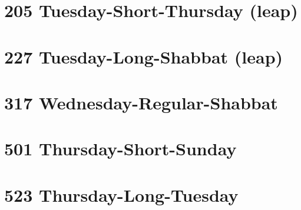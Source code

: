 \section{205 Tuesday-Short-Thursday (leap)}
\label{205}

\section{227 Tuesday-Long-Shabbat (leap)}
\label{227}

\section{317 Wednesday-Regular-Shabbat}
\label{317}

\section{501 Thursday-Short-Sunday}
\label{501}

\section{523 Thursday-Long-Tuesday}
\label{523}